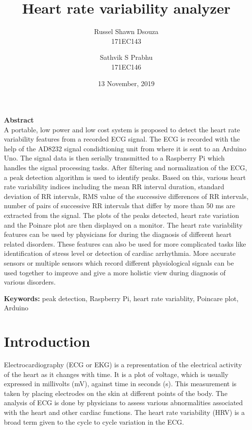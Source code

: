 \documentclass[11pt]{article}
\title{\textbf{Heart rate variability analyzer}}
\author{
  Russel Shawn Dsouza\\
  171EC143
  \and
  Sathvik S Prabhu\\
  171EC146
}
\date{13 November, 2019}
\theoremstyle{definition}
\begin{document}
  \maketitle
  \thispagestyle{empty}

  \newpage
  \tableofcontents
  \thispagestyle{empty}

  \setcounter{page}{1}
  \newpage
  \begin{center}
    \large{\textbf{Abstract}}\\
    A portable, low power and low cost system is proposed to detect the heart rate variability features from a recorded ECG signal.
    The ECG is recorded with the help of the AD8232 signal condidtioning unit from where it is sent to an Arduino Uno.
    The signal data is then serially transmitted to a Raspberry Pi which handles the signal processing tasks. After filtering and normalization of the ECG, a peak detection algorithm is used to identify peaks. Based on this, various heart rate variability indices including the mean RR interval duration, standard deviation of RR intervals, RMS value of the successive differences of RR intervals, number of pairs of successive RR intervals that differ by more than 50 ms are extracted from the signal. The plots of the peaks detected, heart rate variation and the Poinare plot are then displayed on a monitor. The heart rate variability features can be used by physicians for during the diagnosis of different heart related disorders. These features can also be used for more complicated tasks like identification of stress level or detection of cardiac arrhythmia. More accurate sensors or  multiple sensors which record different physiological signals can be used together to improve and give a more holistic view during diagnosis of various disorders.

    \textbf{Keywords:} peak detection, Raspberry Pi, heart rate variablity, Poincare plot, Arduino
  \end{center}

  \section{Introduction}
  Electrocardiography (ECG or EKG) is a representation of the electrical activity of the heart as it changes with time. It is a plot of voltage, which is usually expressed in millivolts (mV), against time in seconds (s). This measurement is taken by placing electrodes on the skin at different points of the body. The analysis of ECG is done by physicians to assess various abnormalities associated with the heart and other cardiac functions. The heart rate variability (HRV) is a broad term given to the cycle to cycle variation in the ECG.
\end{document}
